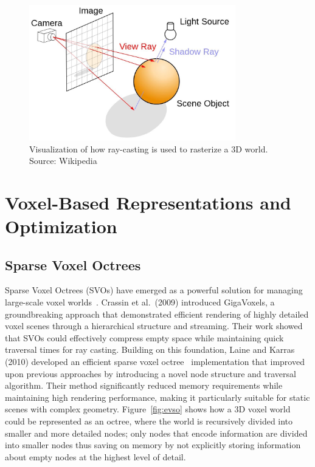 \begin{figure}[thp]
    \begin{center}
        \includegraphics[width=0.8\textwidth]{figures/ray_tracing.jpg}
    \end{center}
    \caption{Visualization of how ray-casting is used to rasterize a 3D world. Source: Wikipedia}
    \label{fig:ray_tracing}
\end{figure}

\section{Voxel-Based Representations and Optimization}

\subsection{Sparse Voxel Octrees}
Sparse Voxel Octrees (SVOs) have emerged as a powerful solution for managing large-scale voxel
worlds~\cite{crassin2009gigavoxels}. Crassin et al.\ (2009) introduced GigaVoxels, a groundbreaking approach that
demonstrated efficient rendering of highly detailed voxel scenes through a hierarchical structure and streaming. Their
work showed that SVOs could effectively compress empty space while maintaining quick traversal times for ray casting.
Building on this foundation, Laine and Karras (2010) developed an efficient sparse voxel octree~\cite{laine2010efficient}
implementation that improved upon previous approaches by introducing a novel node structure and traversal algorithm.
Their method significantly reduced memory requirements while maintaining high rendering performance, making it
particularly suitable for static scenes with complex geometry. Figure~\ref{fig:evso} shows how a 3D voxel world could be
represented as an octree, where the world is recursively divided into smaller and more detailed nodes; only nodes that
encode information are divided into smaller nodes thus saving on memory by not explicitly storing information about
empty nodes at the highest level of detail.

